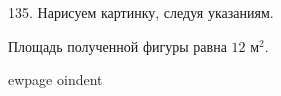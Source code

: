 135. Нарисуем картинку, следуя указаниям.
\begin{center}
\begin{figure}[ht!]
\end{figure}
\end{center}
Площадь полученной фигуры равна $12\text{ м}^2.$

ewpage
oindent
